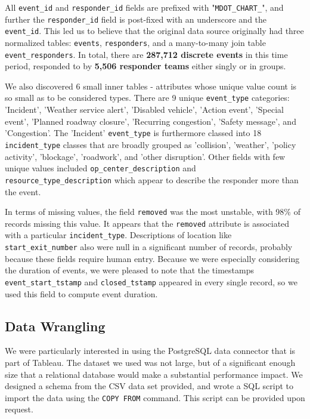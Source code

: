 \documentclass[11pt,letterpaper]{article}
\begin{document}
All \texttt{event\_id} and \texttt{responder\_id} fields are prefixed with "\texttt{MDOT\_CHART\_}", and further the \texttt{responder\_id} field is post-fixed with an underscore and the \texttt{event\_id}. This led us to believe that  the original data source originally had three normalized tables: \texttt{events}, \texttt{responders}, and a many-to-many join table \texttt{event\_responders}. In total, there are \textbf{287,712 discrete events} in this time period, responded to by \textbf{5,506 responder teams} either singly or in groups.

We also discovered 6 small inner tables - attributes whose unique value count is so small as to be considered types. There are 9 unique \texttt{event\_type} categories: 'Incident', 'Weather service alert', 'Disabled vehicle', 'Action event', 'Special event', 'Planned roadway closure', 'Recurring congestion', 'Safety message', and 'Congestion'. The 'Incident' \texttt{event\_type} is furthermore classed into 18 \texttt{incident\_type} classes that are broadly grouped as 'collision', 'weather', 'policy activity', 'blockage', 'roadwork', and 'other disruption'. Other fields with few unique values included \texttt{op\_center\_description} and \texttt{resource\_type\_description} which appear to describe the responder more than the event. 

In terms of missing values, the field \texttt{removed} was the most unstable, with 98\% of records missing this value. It appears that the \texttt{removed} attribute is associated with a particular \texttt{incident\_type}. Descriptions of location like \texttt{start\_exit\_number} also were null in a significant number of records, probably because these fields require human entry. Because we were especially considering the duration of events, we were pleased to note that the timestamps \texttt{event\_start\_tstamp} and \texttt{closed\_tstamp} appeared in every single record, so we used this field to compute event duration. 

\subsection*{Data Wrangling}

We were particularly interested in using the PostgreSQL data connector that is part of Tableau. The dataset we used was not large, but of a significant enough size that a relational database would make a substantial performance impact. We designed a schema from the CSV data set provided, and wrote a SQL script to import the data using the \texttt{COPY FROM} command. This script can be provided upon request. 
\end{document}

